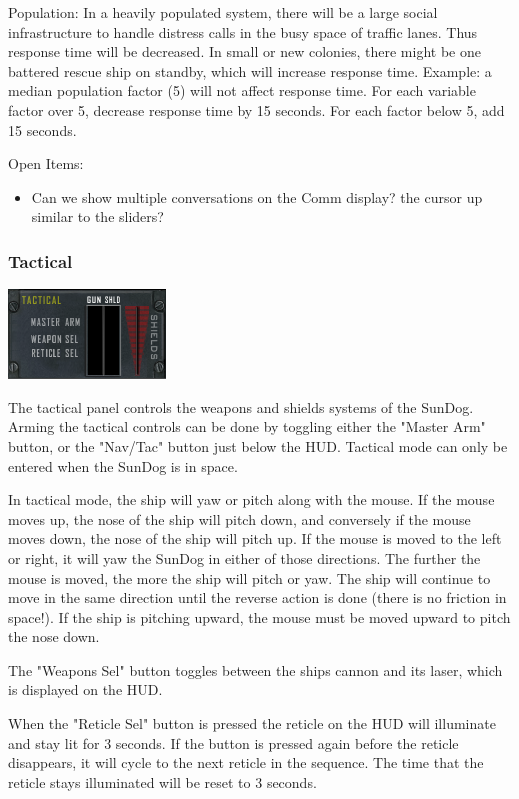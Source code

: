 Population: In a heavily populated system, there will be a large social infrastructure to handle distress calls in the busy space of traffic lanes. Thus response time will be decreased. In small or new colonies, there might be one battered rescue ship on standby, which will increase response time. Example: a median population factor (5) will not affect response time. For each variable factor over 5, decrease response time by 15 seconds. For each factor below 5, add 15 seconds. 

Open Items:
\begin{itemize}
\item  Can we show multiple conversations on the Comm display?
the cursor up similar to the sliders?
\end{itemize}

\subsubsection{Tactical}
\includegraphics[scale=0.7]{images/tactical.png}

The tactical panel controls the weapons and shields systems of the SunDog.
Arming the tactical controls can be done by toggling either the "Master Arm"
button, or the "Nav/Tac" button just below the HUD.  Tactical mode can
only be entered when the SunDog is in space.

In tactical mode, the ship will yaw or pitch along with the mouse.  If
the mouse moves up, the nose of the ship will pitch down, and conversely
if the mouse moves down, the nose of the ship will pitch up.  If the
mouse is moved to the left or right, it will yaw the SunDog in either
of those directions.  The further the mouse is moved, the more the ship
will pitch or yaw.  The ship will continue to move in the same direction until
the reverse action is done (there is no friction in space!).  If the
ship is pitching upward, the mouse must be moved upward to pitch the nose
down.

The "Weapons Sel" button toggles between the ships cannon and its laser, 
which is displayed on the HUD.

When the "Reticle Sel" button is pressed the reticle on the HUD will
illuminate and stay lit for 3 seconds.  If the button is pressed again
before the reticle disappears, it will cycle to the next reticle
in the sequence.  The time that the reticle stays illuminated will
be reset to 3 seconds.

